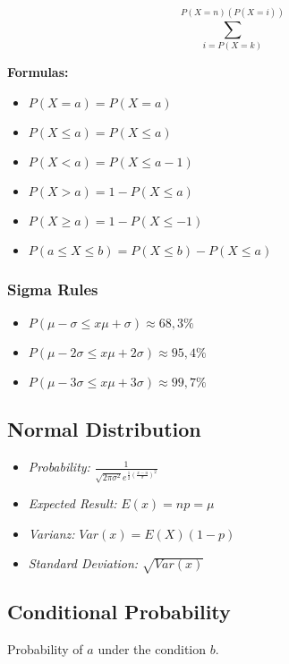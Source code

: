 \[
\sum_{i = P(X=k)}^{P(X=n) (P(X=i))}
\]

\textbf{Formulas: }

\begin{itemize}
    \item \(P(X = a) = P(X = a)\)
    \item \(P(X \le a) = P(X \le a)\)
    \item \(P(X < a) = P(X \le a - 1)\)
    \item \(P(X > a) = 1 - P(X \le a)\)
    \item \(P(X \ge a) = 1 - P(X \le - 1)\)
    \item \(P(a \le X \le b) = P(X \le b) - P(X \le a)\)
\end{itemize}

\subsubsection{Sigma Rules}

\begin{itemize}[label = \(-\)]
    \item \(P(\mu - \sigma \le x \mu + \sigma) \approx 68,3\%\)
    \item \(P(\mu - 2\sigma \le x \mu + 2\sigma) \approx 95,4\%\)
    \item \(P(\mu - 3\sigma \le x \mu + 3\sigma) \approx 99,7\%\)
\end{itemize}

\subsection{Normal Distribution}

\begin{itemize}[label=\(-\)]
    \item \emph{Probability: } \(\frac{1}{\sqrt{2\pi \sigma^2} e^{\frac{1}{2} \left(\frac{x - u}{\sigma}\right)^2}}\)
    \item \emph{Expected Result: } \(E(x) = np = \mu\)
    \item \emph{Varianz: } \(Var(x) = E(X) (1-p)\)
    \item \emph{Standard Deviation: } \(\sqrt{Var(x)}\)
\end{itemize}

\subsection{Conditional Probability}

Probability of \(a\) under the condition \(b\).

